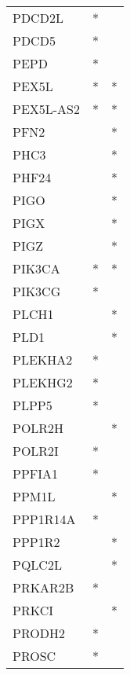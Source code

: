 \begin{longtable}{lcc}
PDCD2L           &              * &            \\
PDCD5            &              * &            \\
PEPD             &              * &            \\
PEX5L            &              * &          * \\
PEX5L-AS2        &              * &          * \\
PFN2             &                &          * \\
PHC3             &                &          * \\
PHF24            &                &          * \\
PIGO             &                &          * \\
PIGX             &                &          * \\
PIGZ             &                &          * \\
PIK3CA           &              * &          * \\
PIK3CG           &              * &            \\
PLCH1            &                &          * \\
PLD1             &                &          * \\
PLEKHA2          &              * &            \\
PLEKHG2          &              * &            \\
PLPP5            &              * &            \\
POLR2H           &                &          * \\
POLR2I           &              * &            \\
PPFIA1           &              * &            \\
PPM1L            &                &          * \\
PPP1R14A         &              * &            \\
PPP1R2           &                &          * \\
PQLC2L           &                &          * \\
PRKAR2B          &              * &            \\
PRKCI            &                &          * \\
PRODH2           &              * &            \\
PROSC            &              * &            \\

\end{longtable}
